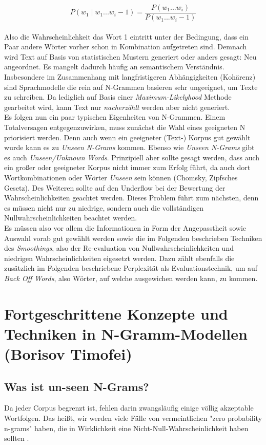 \documentclass[12pt]{article}
\begin{document}
\begin{equation}
	P(w_1 \mid w_1...w_i-1) = \frac {P(w_1...w_i)}{P(w_1...w_i-1)}
\end{equation}
\\
Also die Wahrscheinlichkeit das Wort 1 eintritt unter der Bedingung, dass ein Paar andere Wörter vorher 
schon in Kombination aufgetreten sind. Demnach wird Text auf Basis von statistischen Mustern generiert 
oder anders gesagt: Neu angeordnet. Es mangelt dadurch häufig an semantischem Verständnis. Insbesondere 
im Zusammenhang mit langfristigeren Abhängigkeiten (Kohärenz) sind Sprachmodelle die rein auf N-Grammen 
basieren sehr ungeeignet, um Texte zu schreiben. Da lediglich auf Basis einer \textit{Maximum-Likelyhood} Methode 
gearbeitet wird, kann Text nur \textit{nacherzählt} werden aber nicht generiert.\\
Es folgen nun ein paar typischen Eigenheiten von N-Grammen. Einem Totalversagen entgegenzuwirken, muss 
zunächst die Wahl eines geeigneten N priorisiert werden. Denn auch wenn ein geeigneter (Text-) Korpus 
gut gewählt wurde kann es zu \textit{Unseen N-Grams} kommen. Ebenso wie \textit{Unseen N-Grams} gibt es 
auch \textit{Unseen/Unknown Words}. Prinzipiell aber sollte gesagt werden, dass auch ein großer oder geeigneter Korpus nicht immer zum 
Erfolg führt, da auch dort Wortkombinationen oder Wörter \textit{Unseen} sein können (Chomsky, Zipfsches Gesetz). 
Des Weiteren sollte auf den Underflow bei der Bewertung der Wahrscheinlichkeiten geachtet werden. Dieses 
Problem führt zum nächsten, denn es müssen nicht nur zu niedrige, sondern auch die vollständigen 
Nullwahrscheinlichkeiten beachtet werden.\\
Es müssen also vor allem die Informationen in Form der Angepasstheit sowie Auswahl vorab gut gewählt werden 
sowie die im Folgenden beschrieben Techniken des \textit{Smoothings}, also der Re-evaluation von 
Nullwahrscheinlichkeiten und niedrigen Wahrscheinlichkeiten eigesetzt werden. Dazu zählt ebenfalls die 
zusätzlich im Folgenden beschriebene Perplexität als Evaluationstechnik, um auf \textit{Back Off Words}, also 
Wörter, auf welche ausgewichen werden kann, zu kommen.


\section{Fortgeschrittene Konzepte und Techniken in N-Gramm-Modellen (Borisov Timofei)}
\subsection{Was ist un-seen N-Grams?}
Da jeder Corpus begrenzt ist, fehlen darin zwangsläufig einige völlig akzeptable Wortfolgen. Das heißt, wir werden viele Fälle von vermeintlichen "zero probability n-grams" haben, die in Wirklichkeit eine Nicht-Null-Wahrscheinlichkeit haben sollten \cite{jurafsky2023}.
\end{document}
